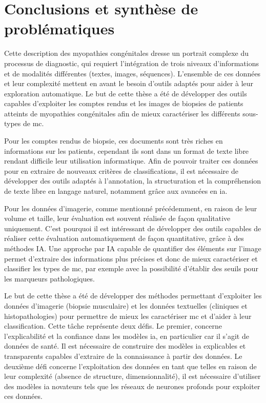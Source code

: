 \section{Conclusions et synthèse de problématiques}
Cette description des myopathies congénitales dresse un portrait complexe du processus de diagnostic, qui requiert l'intégration de trois niveaux d'informations et de modalités différentes (textes, images, séquences). L'ensemble de ces données et leur complexité mettent en avant le besoin d'outils adaptés pour aider à leur exploration automatique. Le but de cette thèse a été de développer des outils capables d'exploiter les comptes rendus et les images de biopsies de patients atteints de myopathies congénitales afin de mieux caractériser les différents sous-types de \gls{mc}.

Pour les comptes rendus de biopsie, ces documents sont très riches en informations sur les patients, cependant ils sont dans un format de texte libre rendant difficile leur utilisation informatique. Afin de pouvoir traiter ces données pour en extraire de nouveaux critères de classifications, il est nécessaire de développer des outils adaptés à l'annotation, la structuration et la compréhension de texte libre en langage naturel, notamment grâce aux avancées en \gls{ia}. 

Pour les données d'imagerie, comme mentionné précédemment, en raison de leur volume et taille, leur évaluation est souvent réalisée de façon qualitative uniquement. C'est pourquoi il est intéressant de développer des outils capables de réaliser cette évaluation automatiquement de façon quantitative, grâce à des méthodes IA. Une approche par IA capable de quantifier des éléments sur l'image permet d'extraire des informations plus précises et donc de mieux caractériser et classifier les types de \gls{mc}, par exemple avec la possibilité d'établir des seuils pour les marqueurs pathologiques.

Le but de cette thèse a été de développer des méthodes permettant d'exploiter les données d'imagerie (biopsie musculaire) et les données textuelles (cliniques et histopathologies) pour permettre de mieux les caractériser \gls{mc} et d'aider à leur classification. Cette tâche représente deux défis. Le premier, concerne l'explicabilité et la confiance dans les modèles \gls{ia}, en particulier car il s'agit de données de santé. Il est nécessaire de construire des modèles \gls{ia} explicables et transparents capables d'extraire de la connaissance à partir des données. Le deuxième défi concerne l'exploitation des données en tant que telles en raison de leur complexité (absence de structure, dimensionnalité), il est nécessaire d'utiliser des modèles \gls{ia} novateurs tels que les réseaux de neurones profonds pour exploiter ces données.

